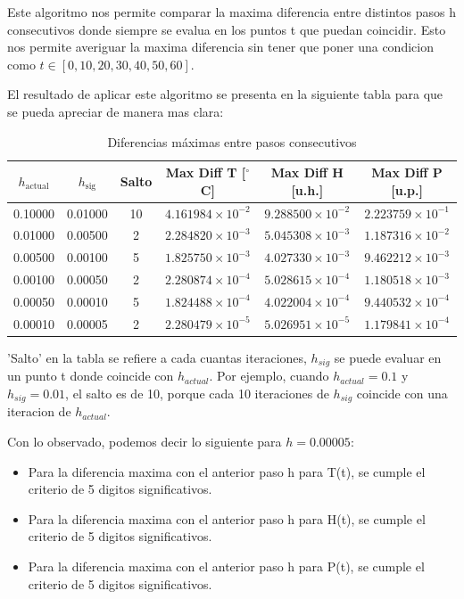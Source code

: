 Este algoritmo nos permite comparar la maxima diferencia entre distintos pasos h consecutivos donde siempre se evalua en los puntos t que puedan coincidir. Esto nos permite averiguar la maxima diferencia sin tener que poner una condicion como $t \in [0,10,20,30,40,50,60]$.

El resultado de aplicar este algoritmo se presenta en la siguiente tabla para que se pueda apreciar de manera mas clara:

\begin{table}[H]
    \centering
    \begin{tabular}{|c|c|c|c|c|c|}
        \hline
        $h_{\text{actual}}$ & $h_{\text{sig}}$ & Salto &
        Max Diff T [$^\circ$C] & Max Diff H [u.h.] & Max Diff P [u.p.] \\
        \hline
        0.10000 & 0.01000 & 10 & $4.161984 \times 10^{-2}$ & $9.288500 \times 10^{-2}$ & $2.223759\times 10^{-1}$ \\
        0.01000 & 0.00500 & 2  & $2.284820 \times 10^{-3}$ & $5.045308 \times 10^{-3}$ & $1.187316 \times 10^{-2}$ \\
        0.00500 & 0.00100 & 5  & $1.825750 \times 10^{-3}$ & $4.027330 \times 10^{-3}$ & $9.462212 \times 10^{-3}$ \\
        0.00100 & 0.00050 & 2  & $2.280874 \times 10^{-4}$ & $5.028615 \times 10^{-4}$ & $1.180518 \times 10^{-3}$ \\
        0.00050 & 0.00010 & 5  & $1.824488 \times 10^{-4}$ & $4.022004 \times 10^{-4}$ & $9.440532 \times 10^{-4}$ \\
        0.00010 & 0.00005 & 2  & $2.280479 \times 10^{-5}$ & $5.026951 \times 10^{-5}$ & $1.179841 \times 10^{-4}$ \\
        \hline
    \end{tabular}
    \caption{Diferencias máximas entre pasos consecutivos}
    \label{tab:diferencias_pasos}
\end{table}

'Salto' en la tabla se refiere a cada cuantas iteraciones, $h_{sig}$ se puede evaluar en un punto t donde coincide con $h_{actual}$. Por ejemplo, cuando $h_{actual} = 0.1$ y $h_{sig} = 0.01$, el salto es de 10, porque cada 10 iteraciones de $h_{sig}$ coincide con una iteracion de $h_{actual}$.

Con lo observado, podemos decir lo siguiente para $h = 0.00005$:

\begin{itemize}
    \item Para la diferencia maxima con el anterior paso h para T(t), se cumple el criterio de 5 digitos significativos.
    \item Para la diferencia maxima con el anterior paso h para H(t), se cumple el criterio de 5 digitos significativos.
    \item Para la diferencia maxima con el anterior paso h para P(t), se cumple el criterio de 5 digitos significativos.   
\end{itemize}

